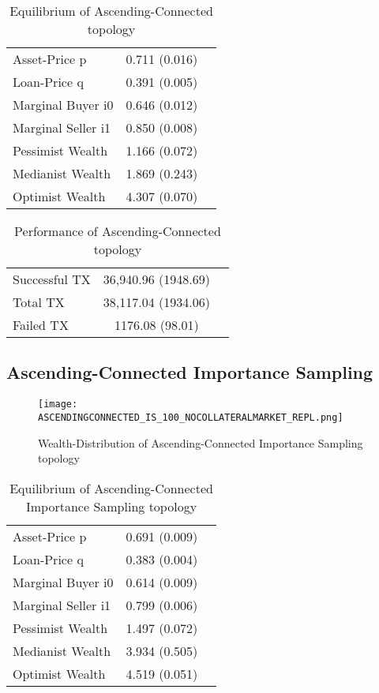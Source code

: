 \documentclass[Bachelorarbeit.tex]{subfiles}
\begin{document}
\begin{table}[h]
	\caption{Equilibrium of Ascending-Connected topology}
	\centering
	\begin{tabular} { l c r }
		\hline
		Asset-Price p & 0.711 (0.016) \\
		Loan-Price q & 0.391 (0.005) \\
		Marginal Buyer i0 & 0.646 (0.012) \\
		Marginal Seller i1 & 0.850 (0.008) \\
		\hline
		Pessimist Wealth & 1.166 (0.072) \\
		Medianist Wealth & 1.869 (0.243) \\
		Optimist Wealth & 4.307 (0.070) \\
		\hline
	\end{tabular}
	\label{tab:ascendingconnected_equilibrium_100Agents_05Bond}
\end{table} 

\begin{table}[h]
	\caption{Performance of Ascending-Connected topology}
	\centering
	\begin{tabular} { l c r }
		\hline
		Successful TX & 36,940.96 (1948.69) \\
		Total TX & 38,117.04 (1934.06) \\
		Failed TX & 1176.08 (98.01) \\
		\hline
	\end{tabular}
\end{table}

\subsection{Ascending-Connected Importance Sampling}
\begin{figure}[H]
	\centering
  \texttt{[image: ASCENDINGCONNECTED\_IS\_100\_NOCOLLATERALMARKET\_REPL.png]}
	\caption{Wealth-Distribution of Ascending-Connected Importance Sampling topology}
	\label{fig:wealth_ASCENDINGCONNECTED_IS_100_NOCOLLATERALMARKET_REPL}
\end{figure}

\begin{table}[h]
	\caption{Equilibrium of Ascending-Connected Importance Sampling topology}
	\centering
	\begin{tabular} { l c r }
		\hline
		Asset-Price p & 0.691 (0.009) \\
		Loan-Price q & 0.383 (0.004) \\
		Marginal Buyer i0 & 0.614 (0.009) \\
		Marginal Seller i1 & 0.799 (0.006) \\
		\hline
		Pessimist Wealth & 1.497 (0.072) \\
		Medianist Wealth & 3.934 (0.505) \\
		Optimist Wealth & 4.519 (0.051) \\
		\hline
	\end{tabular}
\end{table} 
\end{document}
